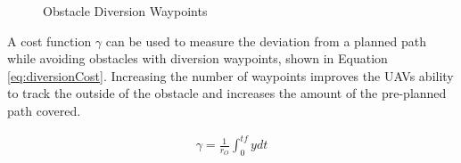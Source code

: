 \documentclass[conf]{new-aiaa}
\begin{document}
\begin{figure}[H]
	\begin{subfigmatrix}{2}%
		\centering	
		\hspace*{0mm}
	\end{subfigmatrix}
	\caption{Obstacle Diversion Waypoints}
	\label{fig:numWaypointsPath}
\end{figure}


A cost function $\gamma$ can be used to measure the deviation from a planned path while avoiding obstacles with diversion waypoints, shown in Equation \ref{eq:diversionCost}. Increasing the number of waypoints improves the UAVs ability to track the outside of the obstacle and increases the amount of the pre-planned path covered. 

\begin{equation}
\label{eq:diversionCost}
\begin{aligned}
\gamma =  \frac{1}{r_O}\int_{0}^{tf}ydt
\end{aligned}
\end{equation}
\end{document}
